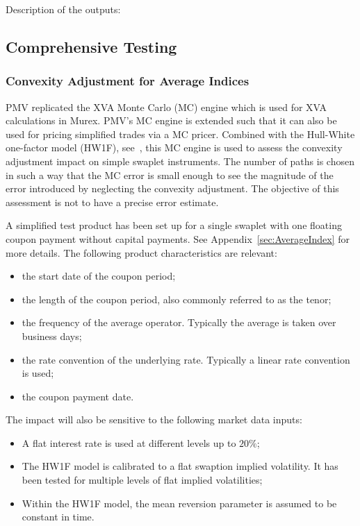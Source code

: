 \documentclass[]{pmv_report} %
\begin{document}
Description of the outputs:







\subsection{Comprehensive Testing}\label{sec:ComprehensiveTesting}

\subsubsection{Convexity Adjustment for Average Indices}
PMV replicated the XVA Monte Carlo (MC) engine which is used for XVA calculations in Murex.
PMV’s MC engine is extended such that it can also be used for pricing simplified trades via a MC pricer.
Combined with the Hull-White one-factor model (HW1F), see~\cite{Mx.XVAFramework}, this MC engine is used to assess the convexity adjustment impact on simple swaplet instruments.
The number of paths is chosen in such a way that the MC error is small enough to see the magnitude of the error introduced by neglecting the convexity adjustment.
The objective of this assessment is not to have a precise error estimate.

A simplified test product has been set up for a single swaplet with one floating coupon payment without capital payments.
See Appendix~\ref{sec:AverageIndex} for more details.
The following product characteristics are relevant:
\begin{itemize}
 \item the start date of the coupon period;
 \item the length of the coupon period, also commonly referred to as the tenor;
 \item the frequency of the average operator.
 Typically the average is taken over business days;
 \item the rate convention of the underlying rate.
 Typically a linear rate convention is used;
 \item the coupon payment date.
\end{itemize}

The impact will also be sensitive to the following market data inputs:
\begin{itemize}
 \item A flat interest rate is used at different levels up to $20\%$;
 \item The HW1F model is calibrated to a flat swaption implied volatility.
 It has been tested for multiple levels of flat implied volatilities;
 \item Within the HW1F model, the mean reversion parameter is assumed to be constant in time.
\end{itemize}
\end{document}
